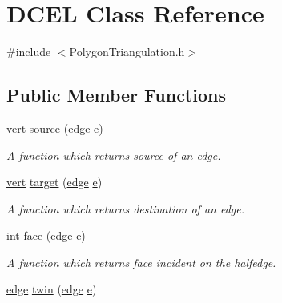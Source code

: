 \hypertarget{class_d_c_e_l}{}\section{D\+C\+EL Class Reference}
\label{class_d_c_e_l}


{\ttfamily \#include $<$Polygon\+Triangulation.\+h$>$}

\subsection*{Public Member Functions}
\begin{DoxyCompactItemize}
\item 
\hyperlink{_polygon_triangulation_8h_a15bccd83c1e570e4a0ff17c42152989b}{vert} \hyperlink{class_d_c_e_l_aefc1eac40e592c8616801c02b5f45545}{source} (\hyperlink{_polygon_triangulation_8h_a4ef43ff5c6d42dacbc8ffd9c8cfdc189}{edge} \hyperlink{_polygon_triangulation_8h_af4fe7231ba50bcef9e679a62325dea81}{e})
\begin{DoxyCompactList}\small\item\em A function which returns source of an edge. \end{DoxyCompactList}\item 
\hyperlink{_polygon_triangulation_8h_a15bccd83c1e570e4a0ff17c42152989b}{vert} \hyperlink{class_d_c_e_l_ad0eee4ae2f3c3676fc808e4359a0a874}{target} (\hyperlink{_polygon_triangulation_8h_a4ef43ff5c6d42dacbc8ffd9c8cfdc189}{edge} \hyperlink{_polygon_triangulation_8h_af4fe7231ba50bcef9e679a62325dea81}{e})
\begin{DoxyCompactList}\small\item\em A function which returns destination of an edge. \end{DoxyCompactList}\item 
int \hyperlink{class_d_c_e_l_a484956955fab5d68192aace0ca07bf70}{face} (\hyperlink{_polygon_triangulation_8h_a4ef43ff5c6d42dacbc8ffd9c8cfdc189}{edge} \hyperlink{_polygon_triangulation_8h_af4fe7231ba50bcef9e679a62325dea81}{e})
\begin{DoxyCompactList}\small\item\em A function which returns face incident on the halfedge. \end{DoxyCompactList}\item 
\hyperlink{_polygon_triangulation_8h_a4ef43ff5c6d42dacbc8ffd9c8cfdc189}{edge} \hyperlink{class_d_c_e_l_a6829b94835f0c953a1f0c557131feef9}{twin} (\hyperlink{_polygon_triangulation_8h_a4ef43ff5c6d42dacbc8ffd9c8cfdc189}{edge} \hyperlink{_polygon_triangulation_8h_af4fe7231ba50bcef9e679a62325dea81}{e})

\end{DoxyCompactItemize}
